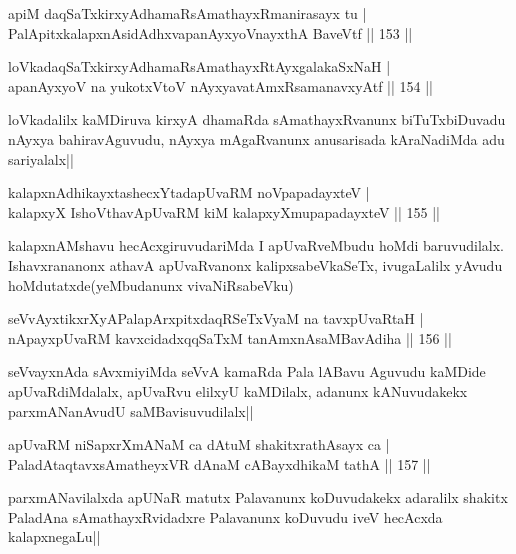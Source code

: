 \begin{shl}
apiM daqSaTxkirxyAdhamaRsAmathayxRmanirasayx tu |\\
PalApitxkalapxnAsidAdhxvapanAyxyoV\s nayxthA BaveVtf \hfill || 153 ||
\end{shl}

\begin{shl}
loVkadaqSaTxkirxyAdhamaRsAmathayxRtAyxgalakaSxNaH |\\
apanAyxyoV na yukotxV\s toV nAyxyavatAmxRsamanavxyAtf \hfill || 154 ||
\end{shl}

\begin{artha}
loVkadalilx kaMDiruva kirxyA dhamaRda sAmathayxRvanunx biTuTxbiDuvadu nAyxya bahiravAguvudu, nAyxya mAgaRvanunx anusarisada kAraNadiMda adu sariyalalx||
\end{artha}

\begin{shl}
kalapxnAdhikayxtashecxYtadapUvaRM noVpapadayxteV  |\\
kalapxyX IshoV\s thavA\s pUvaRM kiM kalapxyXmupapadayxteV \hfill || 155 ||
\end{shl}

\begin{artha}
kalapxnAMshavu hecAcxgiruvudariMda I apUvaRveMbudu hoMdi baruvudilalx. Ishavxrananonx athavA apUvaRvanonx kalipxsabeVkaSeTx, ivugaLalilx yAvudu hoMdutatxde(yeMbudanunx vivaNiRsabeVku)
\end{artha}


\begin{shl}
seVvAyxtikxrXyAPalapArxpitxdaqRSeTxVyaM na tavxpUvaRtaH |\\
nApayxpUvaRM kavxcidadxqqSaTxM tanAmxnAsaMBavAdiha \hfill || 156 ||
\end{shl}

\begin{artha}
seVvayxnAda sAvxmiyiMda seVvA kamaRda Pala lABavu Aguvudu kaMDide apUvaRdiMdalalx, apUvaRvu elilxyU kaMDilalx, adanunx kANuvudakekx parxmANanAvudU saMBavisuvudilalx||
\end{artha}

\begin{shl}
apUvaRM niSapxrXmANaM ca dAtuM shakitxrathAsayx ca |\\
PaladAtaqtavxsAmatheyxVR dAnaM cABayxdhikaM tathA \hfill || 157 ||
\end{shl}

\begin{artha}%
parxmANavilalxda apUNaR matutx Palavanunx koDuvudakekx adaralilx shakitx PaladAna sAmathayxRvidadxre Palavanunx koDuvudu iveV hecAcxda kalapxnegaLu||
\end{artha}

